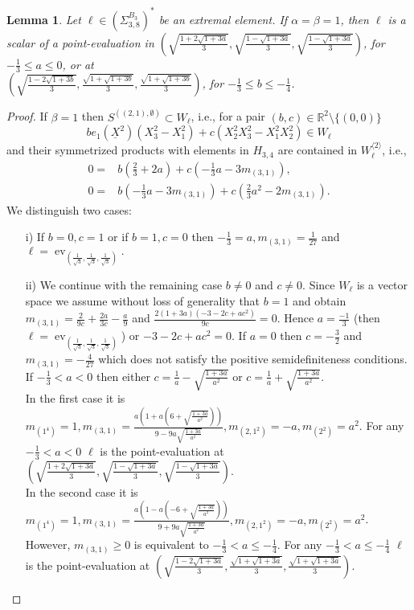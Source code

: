 \documentclass[11pt,a4paper]{amsart}
\numberwithin{equation}{section}
\newtheorem{lemma}[thm]{Lemma}
\theoremstyle{definition}
\newcommand{\R}{\mathbb{R}}
\DeclareMathOperator{\ev}{ev}
\numberwithin{thm}{section}
\theoremstyle{break}
\numberwithin{subcase}{case}
\begin{document}
 \begin{lemma}\label{le:38Teil5}
  Let $\ell \in \left(\Sigma_{3,8}^{B_3}\right)^\ast$ be an extremal element. If $\alpha = \beta= 1$, then $\ell$ is a scalar of a point-evaluation in $\left( \sqrt{\frac{1+2\sqrt{1+3a}}{3}},\sqrt{\frac{1-\sqrt{1+3a}}{3}},\sqrt{\frac{1-\sqrt{1+3a}}{3}}\right)$, for $-\frac{1}{3} \leq a \leq 0$, or at \\
  $\left( \sqrt{\frac{1-2\sqrt{1+3b}}{3}}, \frac{\sqrt{1+\sqrt{1+3b}}}{3}, \frac{\sqrt{1+\sqrt{1+3b}}}{3}\right)$, for $- \frac{1}{3} \leq b \leq -\frac{1}{4}$. 
 \end{lemma}
 \begin{proof}
  If $\beta = 1$ then $S^{((2,1),\emptyset)} \subset W_\ell$, i.e., for a pair $(b,c) \in \R^2 \setminus \{(0,0)\}$  $$be_1(\underline{X}^2)(X_3^2-X_1^2)+c(X_2^2X_3^2-X_1^2X_2^2) \in W_\ell$$ and their symmetrized products with elements in $H_{3,4}$ are contained in $W_\ell^{\langle 2 \rangle}$, i.e.,  \begin{align*}
      0=& b \left( \frac{2}{3}+2a \right) + c \left( -\frac{1}{3}a-3m_{(3,1)} \right), \\ 0=& b \left( -\frac{1}{3}a-3m_{(3,1)}\right) + c \left( \frac{2}{3}a^2-2m_{(3,1)}\right).
  \end{align*}
  We distinguish two cases:
  \begin{itemize}
      \item[i)] If $b =0,c=1$ or if $b=1,c=0$ then $-\frac{1}{3}=a, m_{(3,1)} = \frac{1}{27}$ and $\ell = \ev_{\left( \frac{1}{\sqrt{3}},\frac{1}{\sqrt{3}},\frac{1}{\sqrt{3}}\right)}.$
      \item[ii)] We continue with the remaining case $b\neq 0$ and $c \neq 0$.
Since $W_\ell$ is a vector space we assume without loss of generality that $b=1$ and obtain $m_{(3,1)} = \frac{2}{9c}+\frac{2a}{3c}-\frac{a}{9}$ and $\frac{2(1+3a)(-3-2c+ac^2)}{9c}=0$. Hence $a=\frac{-1}{3}$ (then $\ell = \ev_{(\frac{1}{\sqrt{3}},\frac{1}{\sqrt{3}},\frac{1}{\sqrt{3}})}$) or $-3-2c+ac^2=0$. If $a=0$ then $c=-\frac{3}{2}$ and $m_{(3,1)}= -\frac{4}{27}$ which does not satisfy the positive semidefiniteness conditions. 
If $-\frac{1}{3} < a < 0$ then either $c = \frac{1}{a}-\sqrt{\frac{1+3a}{a^2}}$ or $c = \frac{1}{a}+\sqrt{\frac{1+3a}{a^2}}$.  \\
 In the first case it is $m_{(1^4)}=1,m_{(3,1)} = \frac{a\left(1+a\left(6+\sqrt{\frac{1+3a}{a^2}}\right)\right)}{9-9a\sqrt{\frac{1+3a}{a^2}}}, m_{(2,1^2)}=-a,m_{(2^2)}=a^2$. For any $-\frac{1}{3}< a < 0$ $\ell$ is the point-evaluation at  $\left( \sqrt{\frac{1+2\sqrt{1+3a}}{3}},\sqrt{\frac{1-\sqrt{1+3a}}{3}},\sqrt{\frac{1-\sqrt{1+3a}}{3}}\right)$. \\
 In the second case it is $m_{(1^4)}=1,m_{(3,1)} = \frac{a\left(1-a\left(-6+\sqrt{\frac{1+3a}{a^2}}\right)\right)}{9+9a\sqrt{\frac{1+3a}{a^2}}}, m_{(2,1^2)}=-a,m_{(2^2)}=a^2$. However, $m_{(3,1)} \geq 0$ is equivalent to $- \frac{1}{3} < a \leq -\frac{1}{4}.$ For any $- \frac{1}{3} < a \leq -\frac{1}{4}$ $\ell$ is the point-evaluation at $\left( \sqrt{\frac{1-2\sqrt{1+3a}}{3}}, \frac{\sqrt{1+\sqrt{1+3a}}}{3}, \frac{\sqrt{1+\sqrt{1+3a}}}{3}\right).$ 
  \end{itemize}
 \end{proof}
\end{document}
